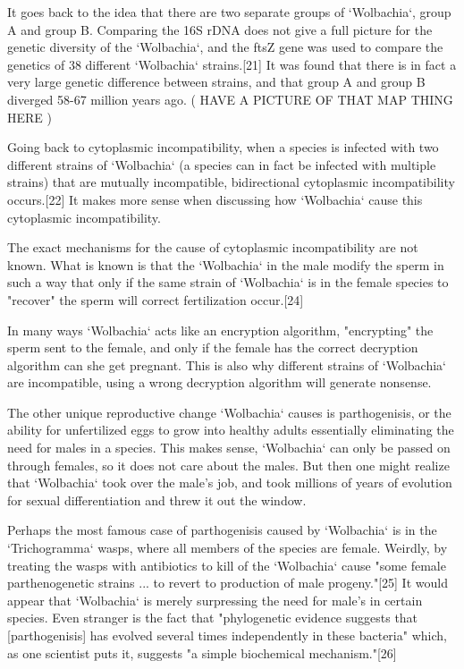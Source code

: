 \documentclass[twocolumn]{article}
\begin{document}
It goes back to the idea that there are two separate groups of `Wolbachia`, group A and group B. Comparing the 16S rDNA does not give a full picture for the genetic diversity of the `Wolbachia`, and the ftsZ gene was used to compare the genetics of 38 different `Wolbachia` strains.[21] It was found that there is in fact a very large genetic difference between strains, and that group A and group B diverged 58-67 million years ago. ( HAVE A PICTURE OF THAT MAP THING HERE )

Going back to cytoplasmic incompatibility, when a species is infected with two different strains of `Wolbachia` (a species can in fact be infected with multiple strains) that are mutually incompatible, bidirectional cytoplasmic incompatibility occurs.[22] It makes more sense when discussing how `Wolbachia` cause this cytoplasmic incompatibility.

The exact mechanisms for the cause of cytoplasmic incompatibility are not known. What is known is that the `Wolbachia` in the male modify the sperm in such a way that only if the same strain of `Wolbachia` is in the female species to "recover" the sperm will correct fertilization occur.[24]

In many ways `Wolbachia` acts like an encryption algorithm, "encrypting" the sperm sent to the female, and only if the female has the correct decryption algorithm can she get pregnant. This is also why different strains of `Wolbachia` are incompatible, using a wrong decryption algorithm will generate nonsense.

The other unique reproductive change `Wolbachia` causes is parthogenisis, or the ability for unfertilized eggs to grow into healthy adults essentially eliminating the need for males in a species. This makes sense, `Wolbachia` can only be passed on through females, so it does not care about the males. But then one might realize that `Wolbachia` took over the male's job, and took millions of years of evolution for sexual differentiation and threw it out the window.

Perhaps the most famous case of parthogenisis caused by `Wolbachia` is in the `Trichogramma` wasps, where all members of the species are female. Weirdly, by treating the wasps with antibiotics to kill of the `Wolbachia` cause "some female parthenogenetic strains ... to revert to production of male progeny."[25] It would appear that `Wolbachia` is merely surpressing the need for male's in certain species. Even stranger is the fact that "phylogenetic evidence suggests that [parthogenisis] has evolved several times independently in these bacteria" which, as one scientist puts it, suggests "a simple biochemical mechanism."[26]  
\end{document}
